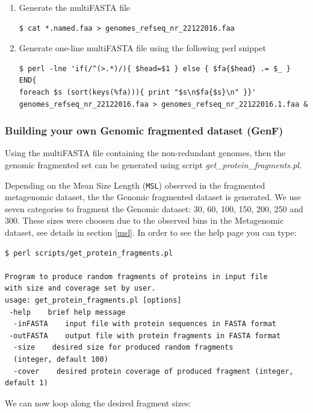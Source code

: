 \documentclass[12pt]{report}
\begin{document}
\begin{enumerate}
\item  Generate the multiFASTA file 

\begin{verbatim}
$ cat *.named.faa > genomes_refseq_nr_22122016.faa
\end{verbatim}

\item Generate one-line multiFASTA file using the following perl snippet

\begin{verbatim}
$ perl -lne 'if(/^(>.*)/){ $head=$1 } else { $fa{$head} .= $_ } END{ 
foreach $s (sort(keys(%fa))){ print "$s\n$fa{$s}\n" }}' 
genomes_refseq_nr_22122016.faa > genomes_refseq_nr_22122016.1.faa & 
\end{verbatim}

\end{enumerate}

\subsubsection{Building your own Genomic fragmented dataset (GenF)}

Using the multiFASTA file containing the non-redundant genomes, then the genomic fragmented set can be generated using script \textit{get\_protein\_fragments.pl}.

Depending on the Mean Size Length (\texttt{MSL}) observed in the fragmented metagenomic dataset, the the Genomic fragmented dataset is generated. We use seven categories to fragment the Genomic dataset: 30, 60, 100, 150, 200, 250 and 300. These sizes were choosen due to the observed bins in the Metagenomic dataset, see details in section \ref{msl}. In order to see the help page you can type:

\begin{verbatim}
$ perl scripts/get_protein_fragments.pl 

Program to produce random fragments of proteins in input file 
with size and coverage set by user.
usage: get_protein_fragments.pl [options] 
 -help    brief help message
  -inFASTA    input file with protein sequences in FASTA format
 -outFASTA    output file with protein fragments in FASTA format
  -size    desired size for produced random fragments    
  (integer, default 100)
  -cover    desired protein coverage of produced fragment (integer, default 1) 
\end{verbatim}

We can now loop along the desired fragment sizes:
\end{document}
